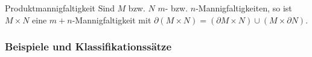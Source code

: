 \begin{Satz}{Produktmannigfaltigkeit}
    Sind $M$ bzw. $N$ $m$- bzw. $n$-Mannigfaltigkeiten, so ist
    $M \times N$ eine $m + n$-Mannigfaltigkeit mit
    $\partial (M \times N) = (\partial M \times N) \cup (M \times \partial N)$.
\end{Satz}






\pagebreak

\subsubsection{%
    Beispiele und Klassifikationssätze%
}

